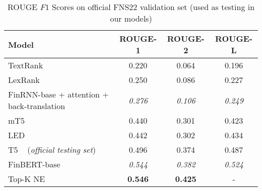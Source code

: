 \begin{table}[ht]
    \centering
    \begin{tabular}{lccc}
        \toprule
        \textbf{Model} & \textbf{ROUGE-1} & \textbf{ROUGE-2} & \textbf{ROUGE-L} \\
        \midrule
            TextRank ~\cite{mihalcea-tarau-2004-textrank} & 0.220 & 0.064 & 0.196 \\
            LexRank ~\cite{Erkan2004LexRankGC} & 0.250 & 0.086 & 0.227 \\
        \midrule
            FinRNN-base + attention + back-translation & \emph{0.276} & \emph{0.106} & \emph{0.249} \\
            mT5 ~\cite{foroutan-etal-2022-multilingual} & 0.440 & 0.301 & 0.423 \\
            LED ~\cite{khanna-etal-2022-transformer} & 0.442 & 0.302 & 0.434 \\
            T5 ~\cite{el-haj-etal-2022-financial} (\emph{official testing set}) & 0.496 & 0.374 & 0.487 \\
            FinBERT-base & \emph{0.544} & \emph{0.382} & \emph{0.524} \\
            Top-K NE ~\cite{shukla-etal-2022-dimsum} & \textbf{0.546} & \textbf{0.425} & - \\
        \bottomrule
    \end{tabular}\caption{ROUGE $F1$ Scores on official FNS22 validation set (used as testing in our models)}
    \label{tab:rouge_performance_validation_fns}
\end{table}

